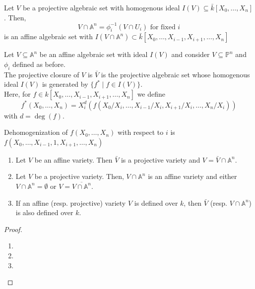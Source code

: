 \documentclass[oneside, 12pt]{scrbook}
\theoremstyle{theorem}
\begin{document}
Let $V$ be a projective algebraic set with homogenous ideal $I(V) \subseteq \bar{k}[X_{0} ,\hdots , X_{n}]$. Then, $$V \cap \mathbb{A}^n = \phi_{i}^{-1}(V \cap U_{i}) \text{ for fixed } i $$ is an affine algebraic set with $I(V \cap \mathbb{A}^n ) \subset \bar{k}[X_{0} , \hdots , X_{i-1},X_{i+1}, \hdots , X_{n}]$

\begin{definition}
Let $V \subseteq \mathbb{A}^n$ be an affine algebraic set with ideal $I(V)$ and consider $V \subseteq \mathbb{P}^n$ and $\phi_{i}$ defined as before. \\
The projective closure of $V$ is $\bar{V}$ is the projective algebraic set whose homogenous ideal $I(V)$ is generated by $\{f^* \mid f \in I(V)\}$. \\
Here, for $f \in k[X_{0}, \hdots , X_{i-1}, X_{i+1}, \hdots , X_{n}]$ we define $$f^* (X_{0} , \hdots , X_{n}) = X_{i}^d (f(X_{0}/X_{i}, \hdots , X_{i-1}/X_{i}, X_{i+1}/X_{i}, \hdots , X_{n}/X_{i}))$$ with $d = \deg (f)$.
\end{definition}

\begin{definition}
Dehomogenization of $f(X_{0}, \hdots , X_{n})$ with respect to $i$ is $f(X_{0}, \hdots , X_{i-1}, 1 , X_{i+1}, \hdots ,X_{n})$
\end{definition}

\begin{proposition}
\begin{enumerate}
\item Let $V$ be an affine variety. Then $\bar{V}$ is a projective variety and $V = \bar{V} \cap \mathbb{A}^n$. 
\item Let $V$ be a projective variety. Then, $V \cap \mathbb{A}^n$ is an affine variety and either $V \cap \mathbb{A}^n = \emptyset$ or $V = \overline{V \cap \mathbb{A}^n}$. 
\item If an affine (resp. projective) variety $V$ is defined over $k$, then $\bar{V}$ (resp. $V \cap \mathbb{A}^n$) is also defined over $k$.
\end{enumerate}
\end{proposition}

\begin{proof}
\begin{enumerate}
\item 

\item

\item
\end{enumerate}
\end{proof}
\end{document}
